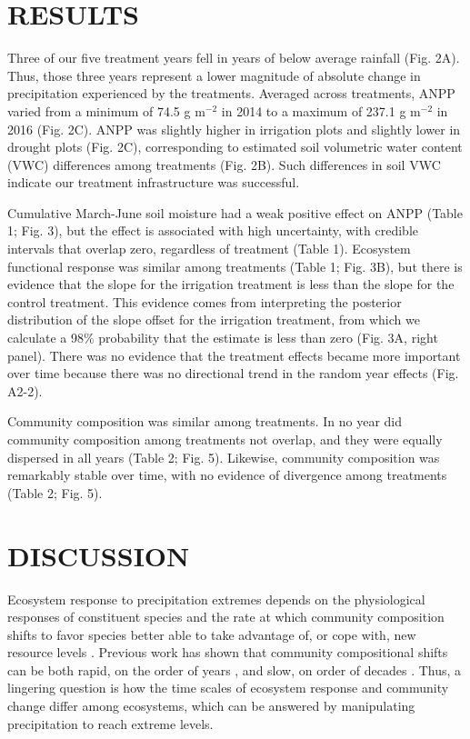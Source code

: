 \documentclass[fleqn,10pt,lineno]{wlpeerj} %
\begin{document}
\section{RESULTS}\label{results}

Three of our five treatment years fell in years of below average
rainfall (Fig. 2A). Thus, those three years represent a lower magnitude
of absolute change in precipitation experienced by the treatments.
Averaged across treatments, ANPP varied from a minimum of 74.5 g
m\(^{-2}\) in 2014 to a maximum of 237.1 g m\(^{-2}\) in 2016 (Fig. 2C).
ANPP was slightly higher in irrigation plots and slightly lower in
drought plots (Fig. 2C), corresponding to estimated soil volumetric
water content (VWC) differences among treatments (Fig. 2B). Such
differences in soil VWC indicate our treatment infrastructure was
successful.

Cumulative March-June soil moisture had a weak positive effect on ANPP
(Table 1; Fig. 3), but the effect is associated with high uncertainty,
with credible intervals that overlap zero, regardless of treatment
(Table 1). Ecosystem functional response was similar among treatments
(Table 1; Fig. 3B), but there is evidence that the slope for the
irrigation treatment is less than the slope for the control treatment.
This evidence comes from interpreting the posterior distribution of the
slope offset for the irrigation treatment, from which we calculate a
98\% probability that the estimate is less than zero (Fig. 3A, right
panel). There was no evidence that the treatment effects became more
important over time because there was no directional trend in the random
year effects (Fig. A2-2).

Community composition was similar among treatments. In no year did
community composition among treatments not overlap, and they were
equally dispersed in all years (Table 2; Fig. 5). Likewise, community
composition was remarkably stable over time, with no evidence of
divergence among treatments (Table 2; Fig. 5).

\section{DISCUSSION}\label{discussion}

Ecosystem response to precipitation extremes depends on the
physiological responses of constituent species and the rate at which
community composition shifts to favor species better able to take
advantage of, or cope with, new resource levels \citep{Smith2009}.
Previous work has shown that community compositional shifts can be both
rapid, on the order of years \citep{Hoover2014}, and slow, on order of
decades \citep{Knapp2012, Wilcox2016}. Thus, a lingering question is how
the time scales of ecosystem response and community change differ among
ecosystems, which can be answered by manipulating precipitation to reach
extreme levels.
\end{document}
